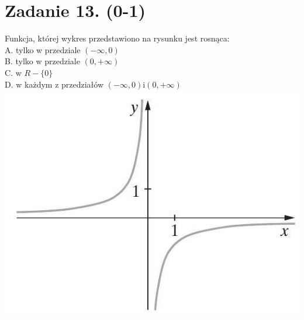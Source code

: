 \documentclass[10pt]{article}
\begin{document}
\section*{Zadanie 13. (0-1)}
Funkcja, której wykres przedstawiono na rysunku jest rosnąca:\\
A. tylko w przedziale \((-\infty, 0)\)\\
B. tylko w przedziale \((0,+\infty)\)\\
C. w \(R-\{0\}\)\\
D. w każdym z przedziałów \((-\infty, 0) \mathrm{i}(0,+\infty)\)\\
\includegraphics[max width=\textwidth, center]{2024_11_21_e15da647cf0a41077ac3g-04(1)}
\end{document}
